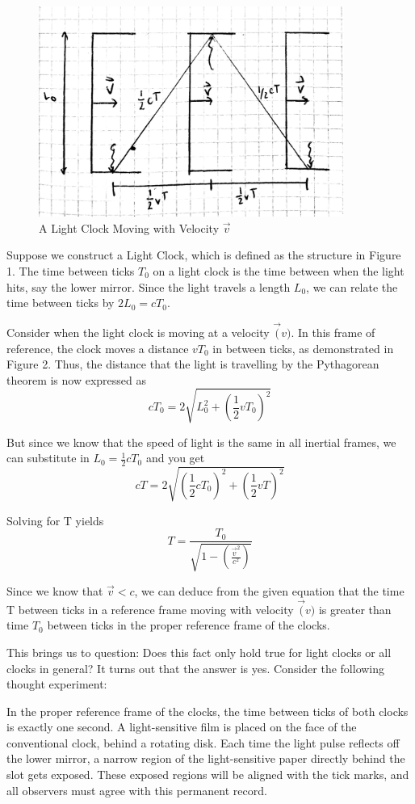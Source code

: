 \documentclass{article}
\begin{document}
\begin{figure}[!htb]
  \centering
  \includegraphics[width=100mm]{lightclockmoving}\par
  \caption{A Light Clock Moving with Velocity \(\vec{v}\)}
\end{figure}

\newpage
Suppose we construct a Light Clock, which is defined as the structure in Figure 1. The time between ticks \(T_0\) on a light clock is the time between when the light hits, say the lower mirror. Since the light travels a length \(L_0\), we can relate the time between ticks by \(2L_0 = cT_0\).

Consider when the light clock is moving at a velocity \(\vec(v)\). In this frame of reference, the clock moves a distance \(vT_0\) in between ticks, as demonstrated in Figure 2. Thus, the distance that the light is travelling by the Pythagorean theorem is now expressed as
\[
cT_0 = 2\sqrt{L_0^2 + (\frac{1}{2}vT_0)^2}
\]

But since we know that the speed of light is the same in all inertial frames, we can substitute in \(L_0 = \frac{1}{2}cT_0\) and you get
\[
cT = 2\sqrt{(\frac{1}{2}cT_0)^2 + (\frac{1}{2}vT)^2}
\]

Solving for T yields
\[
  T = \frac{T_0}{\sqrt{1 - (\frac{\vec{v}^2}{c^2})}}
\]

Since we know that \(\vec{v} < c\), we can deduce from the given equation that the time T between ticks in a reference frame moving with velocity \(\vec(v)\) is greater than time \(T_0\) between ticks in the proper reference frame of the clocks.

This brings us to question: Does this fact only hold true for light clocks or all clocks in general? It turns out that the answer is yes. Consider the following thought experiment:

In the proper reference frame of the clocks, the time between ticks of both clocks is exactly one second. A light-sensitive film is placed on the face of the conventional clock, behind a rotating disk. Each time the light pulse reflects off the lower mirror, a narrow region of the light-sensitive paper directly behind the slot gets exposed. These exposed regions will be aligned with the tick marks, and all observers must agree with this permanent record.
\end{document}
